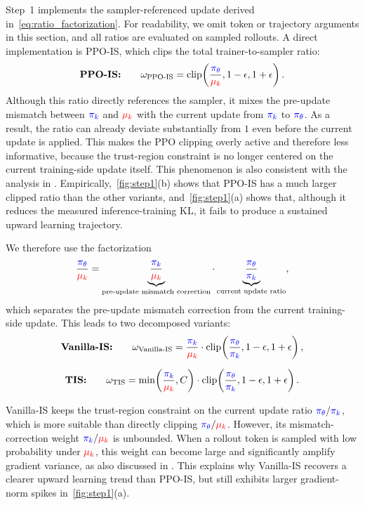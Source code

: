 \documentclass{article}
\begin{document}
Step~1 implements the sampler-referenced update derived in~\autoref{eq:ratio_factorization}. 
For readability, we omit token or trajectory arguments in this section, and all ratios are evaluated on sampled rollouts. 
A direct implementation is PPO-IS, which clips the total trainer-to-sampler ratio:
\[
\textbf{PPO-IS:}
\qquad
\omega_{\mathrm{PPO\text{-}IS}}
=
\operatorname{clip}\!\left(
\frac{\textcolor{blue}{\pi_{\theta}}}{\textcolor{red}{\mu_k}},
1-\epsilon,
1+\epsilon
\right).
\]
Although this ratio directly references the sampler, it mixes the pre-update mismatch between $\textcolor{blue}{\pi_k}$ and $\textcolor{red}{\mu_k}$ with the current update from $\textcolor{blue}{\pi_k}$ to $\textcolor{blue}{\pi_{\theta}}$. 
As a result, the ratio can already deviate substantially from $1$ even before the current update is applied. 
This makes the PPO clipping overly active and therefore less informative, because the trust-region constraint is no longer centered on the current training-side update itself. 
This phenomenon is also consistent with the analysis in \citet{mismatch1}. 
Empirically,~\autoref{fig:step1}(b) shows that PPO-IS has a much larger clipped ratio than the other variants, and~\autoref{fig:step1}(a) shows that, although it reduces the measured inference-training KL, it fails to produce a sustained upward learning trajectory.

We therefore use the factorization
\[
\frac{\textcolor{blue}{\pi_{\theta}}}{\textcolor{red}{\mu_k}}
=
\underbrace{
\frac{\textcolor{blue}{\pi_k}}{\textcolor{red}{\mu_k}}
}_{\text{pre-update mismatch correction}}
\cdot
\underbrace{
\frac{\textcolor{blue}{\pi_{\theta}}}{\textcolor{blue}{\pi_k}}
}_{\text{current update ratio}},
\]
which separates the pre-update mismatch correction from the current training-side update. 
This leads to two decomposed variants:
\begin{gather*}
\textbf{Vanilla-IS:}
\qquad
\omega_{\mathrm{Vanilla\text{-}IS}}
=
\frac{\textcolor{blue}{\pi_k}}{\textcolor{red}{\mu_k}}
\cdot
\operatorname{clip}\!\left(
\frac{\textcolor{blue}{\pi_{\theta}}}{\textcolor{blue}{\pi_k}},
1-\epsilon,
1+\epsilon
\right),
\\[0.6em]
\textbf{TIS:}
\qquad
\omega_{\mathrm{TIS}}
=
\min\!\left(
\frac{\textcolor{blue}{\pi_k}}{\textcolor{red}{\mu_k}},
C
\right)
\cdot
\operatorname{clip}\!\left(
\frac{\textcolor{blue}{\pi_{\theta}}}{\textcolor{blue}{\pi_k}},
1-\epsilon,
1+\epsilon
\right).
\end{gather*}

Vanilla-IS keeps the trust-region constraint on the current update ratio $\textcolor{blue}{\pi_{\theta}}/\textcolor{blue}{\pi_k}$, which is more suitable than directly clipping $\textcolor{blue}{\pi_{\theta}}/\textcolor{red}{\mu_k}$. 
However, its mismatch-correction weight $\textcolor{blue}{\pi_k}/\textcolor{red}{\mu_k}$ is unbounded. 
When a rollout token is sampled with low probability under $\textcolor{red}{\mu_k}$, this weight can become large and significantly amplify gradient variance, as also discussed in \citet{mismatch1}. 
This explains why Vanilla-IS recovers a clearer upward learning trend than PPO-IS, but still exhibits larger gradient-norm spikes in~\autoref{fig:step1}(a).
\end{document}
